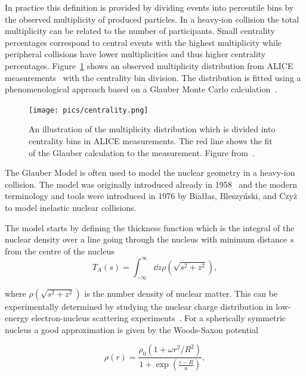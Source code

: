 In practice this definition is provided by dividing events into percentile bins by the observed multiplicity of produced particles. In a heavy-ion collision the total multiplicity can be related to the number of participants. Small centrality percentages correspond to central events with the highest multiplicity while peripheral collisions have lower multiplicities and thus higher centrality percentages. Figure~\ref{fig:centrality} shows an observed multiplicity distribution from ALICE measurements~\cite{PhysRevC.88.044909} with the centrality bin division. The distribution is fitted using a phenomenological approach based on a Glauber Monte Carlo calculation~\cite{Miller:2007ri}.

\begin{figure}[tb]
\centering

               \texttt{[image: pics/centrality.png]}
        \caption[An illustration of the multiplicity distribution in ALICE measurement with centrality classes.]{An illustration of the multiplicity distribution which is divided into centrality bins in ALICE measurements. The red line shows the fit of the Glauber calculation to the measurement. Figure from~\cite{PhysRevC.88.044909}.}
        	\label{fig:centrality}
\end{figure}


The Glauber Model is often used to model the nuclear geometry in a heavy-ion collision. The model was originally introduced already in 1958~\cite{Glauber:1959} and the modern terminology and tools were introduced in 1976 by Białłas, Bleszyński, and Czyż~\cite{Biallas1976461} to model inelastic nuclear collisions.


The model starts by defining the thickness function which is the integral of the nuclear density over a line going through the nucleus with minimum distance $s$ from the centre
of the nucleus
\begin{equation}
T_A\left(s\right)=\int_{-\infty}^{\infty}\dd z \rho\left(\sqrt{s^2+z^2}\right),
\end{equation}

\noindent where $ \rho\left(\sqrt{s^2+z^2}\right)$ is the number density of nuclear matter. This can be experimentally determined by studying the nuclear charge distribution in low-energy electron-nucleus scattering experiments~\cite{Miller:2007ri,DeJager:1987qc}. For a spherically symmetric nucleus a good approximation is given by the Woods-Saxon potential~\cite{Abelev:2013qoq}

\begin{equation}
\rho\left( r\right) = \frac{\rho_0 \left(1+\omega r^2 / R^2\right)}{1+\exp \left(\frac{r-R}{a}\right)},
\end{equation}


